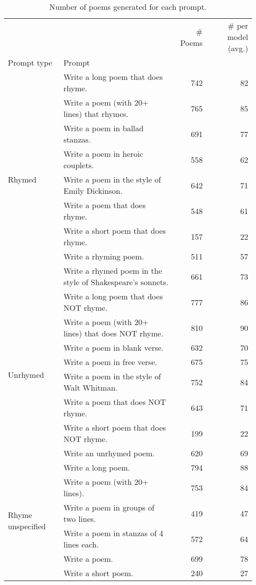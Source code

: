 \begin{table}[H]
  \centering
  \small
  \singlespacing
  \begin{tabular}{llrr}
  \toprule
   &  & \# Poems & \# per model (avg.) \\
  Prompt type & Prompt &  &  \\
  \midrule
  \multirow[t]{9}{*}{Rhymed} & Write a long poem that does rhyme. & 742 & 82 \\
   & Write a poem (with 20+ lines) that rhymes. & 765 & 85 \\
   & Write a poem in ballad stanzas. & 691 & 77 \\
   & Write a poem in heroic couplets. & 558 & 62 \\
   & Write a poem in the style of Emily Dickinson. & 642 & 71 \\
   & Write a poem that does rhyme. & 548 & 61 \\
   & Write a short poem that does rhyme. & 157 & 22 \\
   & Write a rhyming poem. & 511 & 57 \\
   & Write a rhymed poem in the style of Shakespeare's sonnets. & 661 & 73 \\
  \cline{1-4}
  \multirow[t]{8}{*}{Unrhymed} & Write a long poem that does NOT rhyme. & 777 & 86 \\
   & Write a poem (with 20+ lines) that does NOT rhyme. & 810 & 90 \\
   & Write a poem in blank verse. & 632 & 70 \\
   & Write a poem in free verse. & 675 & 75 \\
   & Write a poem in the style of Walt Whitman. & 752 & 84 \\
   & Write a poem that does NOT rhyme. & 643 & 71 \\
   & Write a short poem that does NOT rhyme. & 199 & 22 \\
   & Write an unrhymed poem. & 620 & 69 \\
  \cline{1-4}
  \multirow[t]{6}{*}{Rhyme unspecified} & Write a long poem. & 794 & 88 \\
   & Write a poem (with 20+ lines). & 753 & 84 \\
   & Write a poem in groups of two lines. & 419 & 47 \\
   & Write a poem in stanzas of 4 lines each. & 572 & 64 \\
   & Write a poem. & 699 & 78 \\
   & Write a short poem. & 240 & 27 \\
  \bottomrule
  \end{tabular}
  \caption{Number of poems generated for each prompt.}
  \label{tab:num_poems_rhyme_promptings}
\end{table}